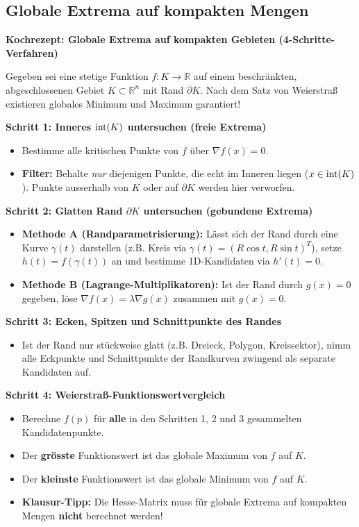 \subsection{Globale Extrema auf kompakten Mengen}

\begin{important}
    \textbf{Kochrezept: Globale Extrema auf kompakten Gebieten (4-Schritte-Verfahren)}
    
    Gegeben sei eine stetige Funktion $f: K \to \mathbb{R}$ auf einem beschränkten, abgeschlossenen Gebiet $K \subset \mathbb{R}^n$ mit Rand $\partial K$. Nach dem Satz von Weierstraß existieren globales Minimum und Maximum garantiert!
    
    \textbf{Schritt 1: Inneres $\operatorname{int}(K)$ untersuchen (freie Extrema)}
    \begin{itemize}
        \item Bestimme alle kritischen Punkte von $f$ über $\nabla f(x) = 0$.
        \item \textbf{Filter:} Behalte \textit{nur} diejenigen Punkte, die echt im Inneren liegen ($x \in \operatorname{int}(K)$). Punkte ausserhalb von $K$ oder auf $\partial K$ werden hier verworfen.
    \end{itemize}

    \textbf{Schritt 2: Glatten Rand $\partial K$ untersuchen (gebundene Extrema)}
    \begin{itemize}
        \item \textbf{Methode A (Randparametrisierung):} Lässt sich der Rand durch eine Kurve $\gamma(t)$ darstellen (z.B. Kreis via $\gamma(t) = (R\cos t, R\sin t)^T$), setze $h(t) = f(\gamma(t))$ an und bestimme 1D-Kandidaten via $h'(t) = 0$.
        \item \textbf{Methode B (Lagrange-Multiplikatoren):} Ist der Rand durch $g(x) = 0$ gegeben, löse $\nabla f(x) = \lambda \nabla g(x)$ zusammen mit $g(x) = 0$.
    \end{itemize}

    \textbf{Schritt 3: Ecken, Spitzen und Schnittpunkte des Randes}
    \begin{itemize}
        \item Ist der Rand nur stückweise glatt (z.B. Dreieck, Polygon, Kreissektor), nimm alle Eckpunkte und Schnittpunkte der Randkurven zwingend als separate Kandidaten auf.
    \end{itemize}

    \textbf{Schritt 4: Weierstraß-Funktionswertvergleich}
    \begin{itemize}
        \item Berechne $f(p)$ für \textbf{alle} in den Schritten 1, 2 und 3 gesammelten Kandidatenpunkte.
        \item Der \textbf{grösste} Funktionswert ist das globale Maximum von $f$ auf $K$.
        \item Der \textbf{kleinste} Funktionswert ist das globale Minimum von $f$ auf $K$.
        \item \textbf{Klausur-Tipp:} Die Hesse-Matrix muss für globale Extrema auf kompakten Mengen \textbf{nicht} berechnet werden!
    \end{itemize}
\end{important}
